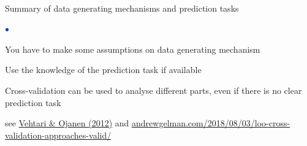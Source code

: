 \documentclass[english,t]{beamer}
\newenvironment{list1}{
   \begin{list}{$\color{list1}\bullet$}{\itemsep=6pt}}{
  \end{list}}
\begin{document}
\begin{frame}{}
  \\
  
\end{frame}

\begin{frame}{}

{\Large\color{navyblue} Summary of data generating mechanisms and prediction tasks}

\begin{list1}
\item You have to make some assumptions on data generating mechanism
\item Use the knowledge of the prediction task if available
\item Cross-validation can be used to analyse different parts, even if
  there is no clear prediction task
\end{list1}

 \vspace{6.5\baselineskip}
{ \small see \href{http://dx.doi.org/10.1214/12-SS102}{Vehtari \& Ojanen (2012)} and \url{andrewgelman.com/2018/08/03/loo-cross-validation-approaches-valid/}}

\end{frame}
\end{document}

